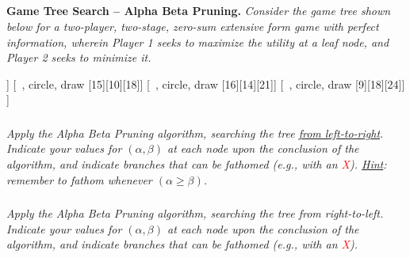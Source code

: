\documentclass[12pt]{amsart}
\begin{document}
\subsection{}
\textbf{Game Tree Search – Alpha Beta Pruning.} 
\textit{Consider the game tree shown below for a two-player, two-stage, 
	zero-sum extensive form game with perfect information, wherein Player
	1 seeks to maximize the utility at a leaf node, and Player 2 seeks to minimize it.}
	\begin{center}
	\begin{forest}
		[\textcolor{white}{1}, circle, fill=ForestGreen, draw, font={\bfseries\large},
			delay={for children={fill=Maroon,font={\bfseries\large},
					label={[below right, xshift=2ex, align=left]$\alpha=$\rule{7.5mm}{0.15mm}\\ $\beta=$\rule{7.5mm}{0.15mm}}
				}}
			[\textcolor{white}2, circle, draw
				[15][33][12]]
			[\textcolor{white}2, circle, draw
				[15][10][18]]
			[\textcolor{white}2, circle, draw
				[16][14][21]]
			[\textcolor{white}2, circle, draw
				[9][18][24]]
		]
	\end{forest}
	\end{center}
	
\subsubsection{}
\textit{Apply the Alpha Beta Pruning algorithm, searching the tree \underline{from left-to-right}. Indicate
	your values for $(\alpha,\beta)$ at each node upon the conclusion of the algorithm, and indicate
	branches that can be fathomed (e.g., with an \textcolor{red}{X}). \underline{Hint}: remember to fathom whenever
	$(\alpha\geq\beta)$.}
	
\subsubsection{}
\textit{Apply the Alpha Beta Pruning algorithm, searching the tree from right-to-left. Indicate
	your values for $(\alpha,\beta)$ at each node upon the conclusion of the algorithm, and indicate
	branches that can be fathomed (e.g., with an \textcolor{red}{X}).	}
	
	
\end{document}
